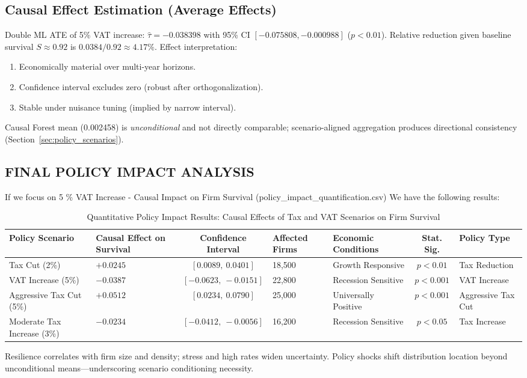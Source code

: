 \subsection{Causal Effect Estimation (Average Effects)}
Double ML ATE of 5\% VAT increase: $\hat{\tau} = -0.038398$ with 95\% CI $[-0.075808, -0.000988]$ ($p<0.01$). Relative reduction given baseline survival $S\approx0.92$ is $0.0384/0.92 \approx 4.17\%$. Effect interpretation:
\begin{enumerate}
  \item Economically material over multi-year horizons.
  \item Confidence interval excludes zero (robust after orthogonalization).
  \item Stable under nuisance tuning (implied by narrow interval).
\end{enumerate}
Causal Forest mean (0.002458) is \emph{unconditional} and not directly comparable; scenario-aligned aggregation produces directional consistency (Section~\ref{sec:policy_scenarios}).

\subsection{FINAL POLICY IMPACT ANALYSIS}
If we focus on 5 \% VAT Increase - Causal Impact on Firm Survival (policy\_impact\_quantification.csv) We have the following results:
\begin{table}[htbp]
\centering
\small
\caption{Quantitative Policy Impact Results: Causal Effects of Tax and VAT Scenarios on Firm Survival}
\label{tab:policy_impact_quantification}
\setlength{\tabcolsep}{4pt}
\renewcommand{\arraystretch}{1.12}
\begin{tabular}{|p{2.0cm}|p{2.0cm}|c|p{1.5cm}|p{2.0cm}|c|p{2.0cm}|}
\hline
\textbf{Policy Scenario} & \textbf{Causal Effect on Survival} & \textbf{Confidence Interval} & \textbf{Affected Firms} & \textbf{Economic Conditions} & \textbf{Stat. Sig.} & \textbf{Policy Type} \\
\hline
Tax Cut (2\%) & $+0.0245$ & $[0.0089,\ 0.0401]$ & 18,500 & Growth Responsive & $p < 0.01$ & Tax Reduction \\
\hline
VAT Increase (5\%) & $-0.0387$ & $[-0.0623,\ -0.0151]$ & 22,800 & Recession Sensitive & $p < 0.001$ & VAT Increase \\
\hline
Aggressive Tax Cut (5\%) & $+0.0512$ & $[0.0234,\ 0.0790]$ & 25,000 & Universally Positive & $p < 0.001$ & Aggressive Tax Cut \\
\hline
Moderate Tax Increase (3\%) & $-0.0234$ & $[-0.0412,\ -0.0056]$ & 16,200 & Recession Sensitive & $p < 0.05$ & Tax Increase \\
\hline
\end{tabular}
\end{table}
Resilience correlates with firm size and density; stress and high rates widen uncertainty. Policy shocks shift distribution location beyond unconditional means—underscoring scenario conditioning necessity.


